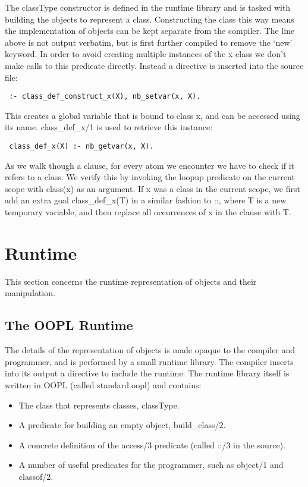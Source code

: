 \documentclass[12pt,a4paper,twoside,openright]{report}
\begin{document}
\bigskip

The classType constructor is defined in the runtime library and is tasked with building the objects to represent a class. Constructing the class this way means the implementation of objects can be kept separate from the compiler. The line above is not output verbatim, but is first further compiled to remove the `new' keyword. In order to avoid creating multiple instances of the x class we don't make calls to this predicate directly. Instead a directive is inserted into the source file:

\begin{lstlisting}
 :- class_def_construct_x(X), nb_setvar(x, X).
\end{lstlisting}
 
   
This creates a global variable that is bound to class x, and can be accessed using its name. class_def_x/1 is used to retrieve this instance:

\begin{lstlisting}
 class_def_x(X) :- nb_getvar(x, X).
\end{lstlisting}
 
As we walk though a clause, for every atom we encounter we have to check if it refers to a class. We verify this by invoking the loopup predicate on the current scope with class(x) as an argument. If x was a class in the current scope, we first add an extra goal class_def_x(T) in a similar fashion to ::, where T is a new temporary variable, and then replace all occurrences of x in the clause with T.

\section{Runtime}

This section concerns the runtime representation of objects and their manipulation.

	\subsection{The OOPL Runtime}

The details of the representation of objects is made opaque to the compiler and programmer, and is performed by a small runtime library. The compiler inserts into its output a directive to include the runtime. The runtime library itself is written in OOPL (called standard.oopl) and contains:

\begin{itemize}
	\item The class that represents classes, classType.
	\item A predicate for building an empty object, build_class/2.
	\item A concrete definition of the access/3 predicate (called ::/3 in the source).
	\item A number of useful predicates for the programmer, such as object/1 and classof/2.
\end{itemize}
\end{document}
